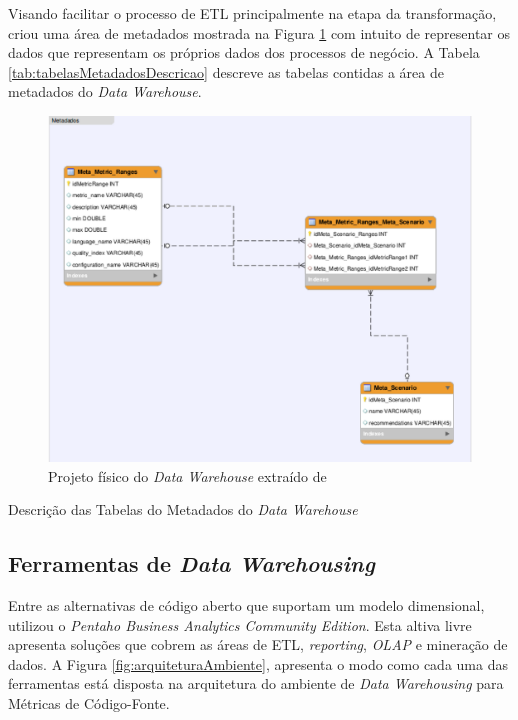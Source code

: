 Visando facilitar o processo de ETL principalmente na etapa da transformação,  criou uma área de metadados mostrada na Figura \ref{fig:metadados} com intuito de representar os dados que representam os próprios dados dos processos de negócio. A Tabela \ref{tab:tabelasMetadadosDescricao} descreve as tabelas contidas a área de metadados do \textit{Data Warehouse}.

\begin{figure}[h!]
\centering
\includegraphics[keepaspectratio=false,scale=0.6]{figuras/figuras_nilton/metadados-baufaker.eps}
\caption{Projeto físico do \textit{Data Warehouse} extraído de }
\label{fig:metadados}
\end{figure}
\FloatBarrier

\begin{table}[!ht]
	\begin{center}
	
	 
	\caption{Descrição das Tabelas do Metadados do \textit{Data Warehouse} }
	\label{tab:tabelasMetadadosDescricao}
	\end{center}
	\end{table}	
	\FloatBarrier

\subsection{Ferramentas de \textit{Data Warehousing}}

Entre as alternativas de código aberto que suportam um modelo dimensional,   utilizou o \textit{Pentaho Business Analytics Community Edition}. Esta altiva livre apresenta soluções que cobrem as áreas de ETL, \textit{reporting}, \textit{OLAP} e mineração de dados. A Figura \ref{fig:arquiteturaAmbiente}, apresenta o modo como cada uma das ferramentas está disposta na arquitetura do ambiente de \textit{Data Warehousing} para Métricas de Código-Fonte.

